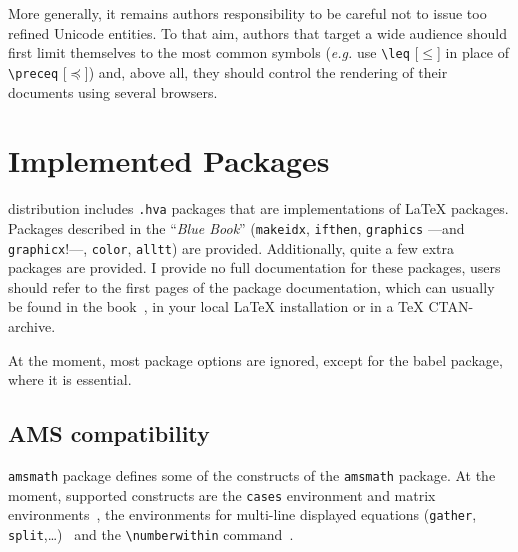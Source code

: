 More generally, it remains authors responsibility to be careful not to
issue too refined Unicode entities.  To that aim, authors that target
a wide audience should first limit themselves to the most common
symbols (\emph{e.g.} use \verb+\leq+ [$\leq$]
in place of \verb+\preceq+ [$\preceq$]) and, above all,
they should control the rendering of their documents using several browsers.

\section{Implemented Packages}\label{implemented:package}
%
\hevea{} distribution includes \texttt{.hva} packages that are
implementations of \LaTeX{} packages.
Packages described in the ``\emph{Blue Book}'' (\texttt{makeidx},
\texttt{ifthen}, \texttt{graphics} ---and \texttt{graphicx}!---,
\texttt{color}, \texttt{alltt}) are provided.  Additionally, quite a
few extra packages are provided.  I provide no full documentation for
these packages, users should refer to the first pages of the package
documentation, which can usually be found in the book~\cite{latexbis},
in your local
\LaTeX{} installation or in a TeX CTAN-archive.

At the moment, most package options are ignored, except for the babel
package, where it is essential.

\subsection{AMS compatibility}
%
\hevea{} \texttt{amsmath} package defines  some of the constructs of the
\texttt{amsmath} package.  At the moment, supported constructs are
the \verb+cases+ environment and matrix
environments~\cite[Section~8.4]{latexbis}, the
environments for multi-line displayed
equations (\verb+gather+,
\verb+split+,\ldots)~\cite[Section~8.5]{latexbis} and the
\verb+\numberwithin+ command~\cite[Section~8.6.2]{latexbis}.

